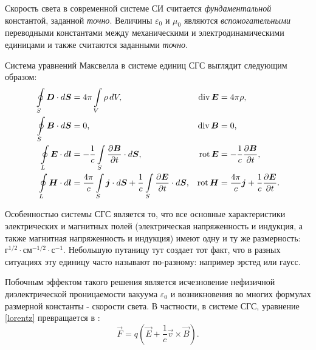 Скорость света в современной системе СИ считается \emph{фундаментальной} константой,
заданной \emph{точно}. Величины $\varepsilon_0$ и $\mu_0$ являются
\emph{вспомогательными} переводными константами между механическими и электродинамическими
единицами и также считаются заданными \emph{точно}.

Система уравнений Максвелла в системе единиц СГС выглядит следующим образом:
\begin{equation}
	\eqmark{maxwell-sgs}
	    \begin{aligned}
        \oint\limits_S\vec{D}\cdot d\vec{S} &= 4\pi \int\limits_V\rho\,dV,
        & \Div\vec{E} &= 4\pi \rho, \\
        \oint\limits_S\vec{B}\cdot d\vec{S} &= 0,
        & \Div\vec{B} &= 0, \\
        \oint\limits_L\vec{E}\cdot d\vec{l} &=
        - \frac{1}{c} \int\limits_S\frac{\partial{\vec{B}}} {\partial t}\cdot d\vec{S},
        & \Rot\vec{E} &= -\frac{1}{c}\frac{\partial\vec B}{\partial t}, \\
        \oint\limits_L\vec{H}\cdot d\vec{l} &=
        \frac{4\pi}{c}\int\limits_S\vec{j}\cdot d\vec{S} +
        \frac{1}{c}\int\limits_S\frac{\partial{\vec{E}}}{\partial t}\cdot d\vec{S},
        & \Rot\vec{H} &= \frac{4\pi}{c}\vec{j} + \frac{1}{c}\frac{\partial\vec E}{\partial t}.
    \end{aligned}
\end{equation}

Особенностью системы СГС является то, что все основные характеристики электрических и магнитных полей 
(электрическая напряженность и индукция, а также магнитная напряженность и индукция) имеют одну и ту же размерность:
$г^{1/2} \cdot см^{−1/2} \cdot с^{−1}$. Небольшую путаницу тут создает тот факт, что в разных ситуациях эту единицу часто называют по-разному:
например эрстед или гаусс.

Побочным эффектом такого решения является исчезновение нефизичной диэлектрической проницаемости вакуума $\varepsilon_0$ и возникновения во многих формулах
размерной константы - скорости света. В частности, в системе СГС, уравнение \eqref{lorentz} превращается в :
\begin{equation*}
	\vec{F} = q \left( \vec{E} + \frac{1}{c}\vec{v} \times \vec{B} \right).
\end{equation*}